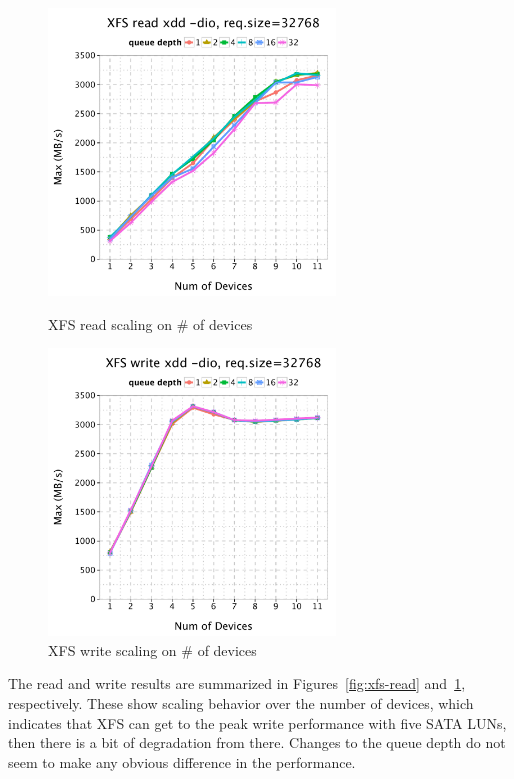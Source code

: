 \documentclass{article}
\begin{document}
\begin{figure}[htb]
\centering
\begin{minipage}[t]{0.5\linewidth}
\centering
\includegraphics[width=3in]{data/xdd-read}
\caption{XFS read scaling on \# of devices}
\label{fig:xfs-read}
\end{minipage}%
\begin{minipage}[t]{0.5\linewidth}
\centering
\includegraphics[width=3in]{data/xdd-write}
\caption{XFS write scaling on \# of devices}
\label{fig:xfs-write}
\end{minipage}%
\end{figure}

The read and write results are summarized in Figures~\ref{fig:xfs-read}
and~\ref{fig:xfs-write}, respectively. These show scaling behavior over the number of devices, which
indicates that XFS can get to the peak write performance with five SATA LUNs,
then there is a bit of degradation from there. Changes to
the queue depth do not seem to make any obvious difference in the performance.
\end{document}

